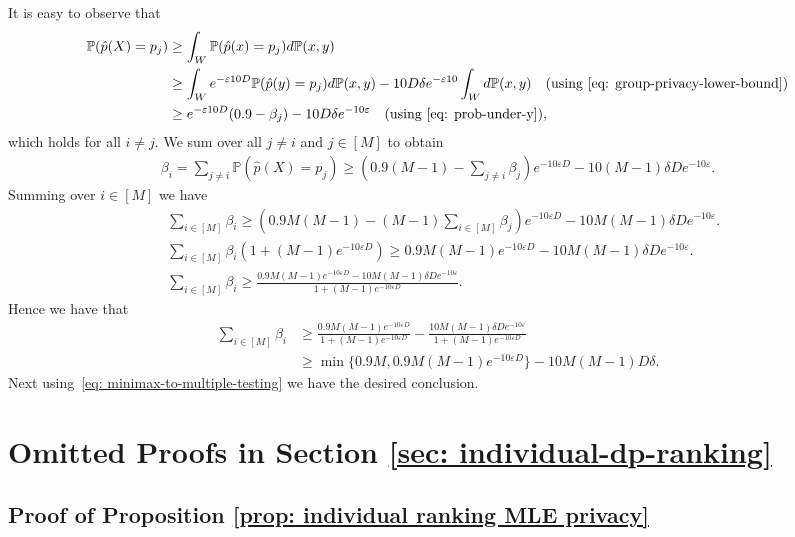 \documentclass[letterpaper,12pt]{article}
\numberwithin{equation}{section}
\theoremstyle{plain}
\numberwithin{Theorem}{section}
\numberwithin{corollary}{section}
\numberwithin{proposition}{section}
\numberwithin{Lemma}{section}
{
	\theoremstyle{definition}
	\newtheorem{Definition}{Definition}
	\newtheorem{example}{Example}
	\numberwithin{example}{section}
	\newtheorem{fact}{Fact}
	\numberwithin{fact}{section}
	\newtheorem{remark}{Remark}
}
\newcommand{\Pro}{\mathbb{P}}
\newcommand{\1}{\mathbbm{1}}
\begin{document}
It is easy to observe that
\begin{align*}
	\Pro(\hat p(X) = p_j) &\geq \int_W \Pro(\hat p(x) = p_j) d\Pro(x,y)\\
	&\geq \int_W e^{-\varepsilon10D}\Pro(\hat p(y) = p_j)d\Pro(x,y)   -10D\delta e^{-\varepsilon10} \int_W d\Pro(x,y)\quad (\text{using} ~\eqref{eq: group-privacy-lower-bound})\\
	&\geq  e^{-\varepsilon10D}(0.9-\beta_j) - 10D\delta e^{-10\varepsilon} \quad (\text{using} ~\eqref{eq: prob-under-y}),
\end{align*}
which holds for all $i\neq j$. We sum over all $j \neq i$ and $j \in[M]$ to obtain 
\begin{align*}
	\beta_i = \sum_{j\neq i} \Pro(\hat p(X)  = p_j)
	\geq \left(0.9(M-1) -\sum_{j\neq i}\beta_j \right)e^{-10\varepsilon D} - 10(M-1)\delta D e^{-10\varepsilon}.
\end{align*}
Summing over $ i \in [M]$ we have
\begin{align*}
	&\sum_{i\in [M]} \beta_i \geq \left(0.9M(M-1) -(M-1)\sum_{i \in [M]}\beta_j \right)e^{-10\varepsilon D} - 10M(M-1)\delta D e^{-10\varepsilon}.\\
	&\sum_{i\in [M]} \beta_i \left(1 + (M-1)e^{-10\varepsilon D}\right)\geq 0.9M(M-1) e^{-10\varepsilon D} - 10M(M-1)\delta D e^{-10\varepsilon}.\\
	& \sum_{i\in [M]} \beta_i \geq \frac{0.9M(M-1) e^{-10\varepsilon D} - 10M(M-1)\delta D e^{-10\varepsilon}}{1 + (M-1)e^{-10\varepsilon D}}.
\end{align*}
Hence we have that
\begin{align*}
	\sum_{i\in [M]} \beta_i &\geq \frac{0.9M(M-1) e^{-10\varepsilon D}}{1 + (M-1)e^{-10\varepsilon D}} - \frac{10M(M-1)\delta D e^{-10\varepsilon}}{1 + (M-1)e^{-10\varepsilon D}}\\
	&\geq \min\{0.9 M, 0.9M(M-1)e^{-10\varepsilon D}\} - 10M(M-1)D\delta.
\end{align*}
Next using~\eqref{eq: minimax-to-multiple-testing} we have the desired conclusion.


\section{Omitted Proofs in Section \ref{sec: individual-dp-ranking}}
\label{sec: omitted proofs in sec: individual-dp-ranking}

\subsection{Proof of Proposition \ref{prop: individual ranking MLE privacy}}
\end{document}

